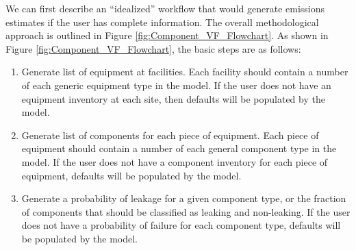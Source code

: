 \documentclass[11pt]{report}
\begin{document}
We can first describe an ``idealized'' workflow that would generate emissions estimates if the user has complete information. The overall methodological approach is outlined in Figure \ref{fig:Component_VF_Flowchart}.  As shown in Figure \ref{fig:Component_VF_Flowchart}, the basic steps are as follows:
\begin{enumerate}
\item Generate list of equipment at facilities. Each facility should contain a number of each generic equipment type in the model. If the user does not have an equipment inventory at each site, then defaults will be populated by the model.
\item Generate list of components for each piece of equipment. Each piece of equipment should contain a number of each general component type in the model. If the user does not have a component inventory for each piece of equipment, defaults will be populated by the model.
\item Generate a probability of leakage for a given component type, or the fraction of components that should be classified as leaking and non-leaking. If the user does not have a probability of failure for each component type, defaults will be populated by the model.


\end{enumerate}
\end{document}
